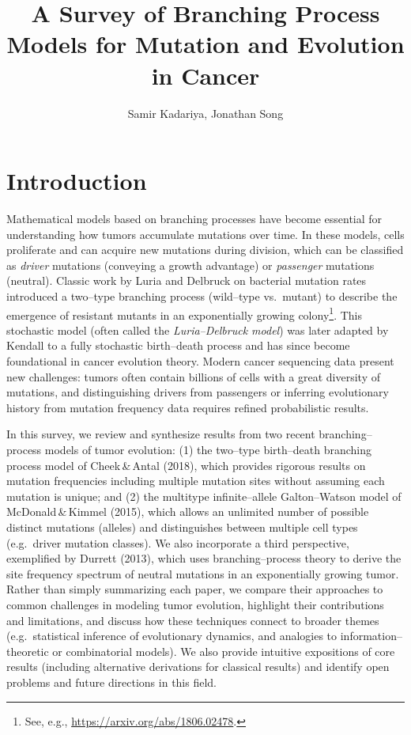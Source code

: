 \documentclass[11pt]{article}
\title{A Survey of Branching Process Models for Mutation and Evolution in Cancer}
\author{Samir Kadariya, Jonathan Song}
\date{}
\begin{document}
\maketitle

\section{Introduction}
Mathematical models based on branching processes have become essential for understanding how tumors accumulate mutations over time. In these models, cells proliferate and can acquire new mutations during division, which can be classified as \emph{driver} mutations (conveying a growth advantage) or \emph{passenger} mutations (neutral). Classic work by Luria and Delbruck on bacterial mutation rates introduced a two--type branching process (wild--type vs.~mutant) to describe the emergence of resistant mutants in an exponentially growing colony\footnote{See, e.g., \url{https://arxiv.org/abs/1806.02478}.}. This stochastic model (often called the \emph{Luria--Delbruck model}) was later adapted by Kendall to a fully stochastic birth--death process and has since become foundational in cancer evolution theory. Modern cancer sequencing data present new challenges: tumors often contain billions of cells with a great diversity of mutations, and distinguishing drivers from passengers or inferring evolutionary history from mutation frequency data requires refined probabilistic results.

In this survey, we review and synthesize results from two recent branching--process models of tumor evolution: (1) the two--type birth--death branching process model of Cheek\,\&\,Antal (2018), which provides rigorous results on mutation frequencies including multiple mutation sites without assuming each mutation is unique; and (2) the multitype infinite--allele Galton--Watson model of McDonald\,\&\,Kimmel (2015), which allows an unlimited number of possible distinct mutations (alleles) and distinguishes between multiple cell types (e.g.~driver mutation classes). We also incorporate a third perspective, exemplified by Durrett (2013), which uses branching--process theory to derive the site frequency spectrum of neutral mutations in an exponentially growing tumor. Rather than simply summarizing each paper, we compare their approaches to common challenges in modeling tumor evolution, highlight their contributions and limitations, and discuss how these techniques connect to broader themes (e.g.~statistical inference of evolutionary dynamics, and analogies to information--theoretic or combinatorial models). We also provide intuitive expositions of core results (including alternative derivations for classical results) and identify open problems and future directions in this field.
\end{document}
